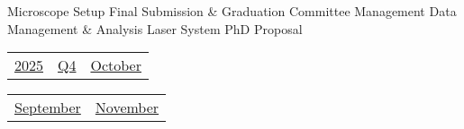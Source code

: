 \vfill{\centering{} \small{Microscope Setup}\hspace{1.5em} \small{Final Submission \& Graduation}\hspace{1.5em} \small{Committee Management}\hspace{1.5em} \small{Data Management \& Analysis}\hspace{1.5em} \small{Laser System}\hspace{1.5em} \small{PhD Proposal}\hspace{1.5em}\par}

\pagebreak
{\noindent\Large\renewcommand{\arraystretch}{\myNumArrayStretch}\begin{tabular}{|l|l|l}
\hyperlink{2025}{2025} & \hyperlink{Q4}{Q4} & \hyperlink{October}{October}
\end{tabular}\hfill%
\begin{tabular}{r|r@{}}
\hyperlink{month-2025-9}{September} & \hyperlink{month-2025-11}{November}
\end{tabular}}
\myLineThick
